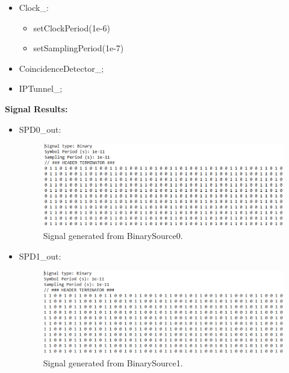 \begin{refsection}
\begin{itemize}
		\item Clock\_:
		\begin{itemize}
			\item setClockPeriod(1e-6)
			\item setSamplingPeriod(1e-7)
		\end{itemize}
		
		\item CoincidenceDetector\_;
		
		\item IPTunnel\_;
		

			
		\end{itemize}


\vspace{15px}


\textbf{Signal Results:}

\begin{itemize}
	
	\item SPD0\_out:
	\begin{figure}[H]
		\centering
		\includegraphics[width=1\linewidth]{./sdf/arduino_quantum_rx/figures/spd0.png}
		\caption{Signal generated from BinarySource0.}
		\label{fig:arduino}
	\end{figure}

	\vspace{50px}
	\item SPD1\_out:
	\begin{figure}[H]
		\centering
		\includegraphics[width=1\linewidth]{./sdf/arduino_quantum_rx/figures/spd1.png}
		\caption{Signal generated from BinarySource1.}
		\label{fig:arduino}
	\end{figure}


\end{itemize}
\end{refsection}
